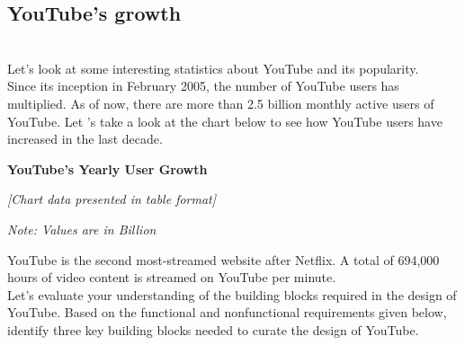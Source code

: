 \subsection{YouTube's growth}\label{7uu0w8L-VylT4NJRY495Z}
\\
Let's look at some interesting statistics about YouTube and its popularity.
\\
Since its inception in February 2005, the number of YouTube users has multiplied. As of now, there are more than 2.5 billion monthly active users of YouTube. Let 's take a look at the chart below to see how YouTube users have increased in the last decade.

\textbf{YouTube's Yearly User Growth}

\textit{\small [Chart data presented in table format]}

\begin{table}[htbp]
\centering
\small
{}
\caption{Increase in monthly active users of YouTube per year}
\label{tab:chart}

\textit{\small Note: Values are in Billion}
\end{table}

YouTube is the second most-streamed website after Netflix. A total of 694,000 hours of video content is streamed on YouTube per minute.
\\
Let's evaluate your understanding of the building blocks required in the design of YouTube. Based on the functional and nonfunctional requirements given below, identify three key building blocks needed to curate the design of YouTube.


